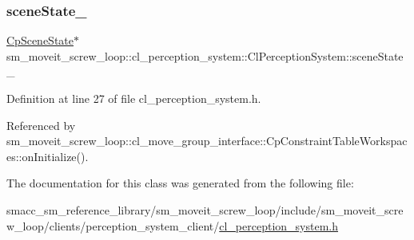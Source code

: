 \subsubsection{\texorpdfstring{scene\+State\+\_\+}{sceneState\_}}
{\footnotesize\ttfamily \hyperlink{classsm__moveit__screw__loop_1_1cl__perception__system_1_1CpSceneState}{Cp\+Scene\+State}$\ast$ sm\+\_\+moveit\+\_\+screw\+\_\+loop\+::cl\+\_\+perception\+\_\+system\+::\+Cl\+Perception\+System\+::scene\+State\+\_\+}



Definition at line 27 of file cl\+\_\+perception\+\_\+system.\+h.



Referenced by sm\+\_\+moveit\+\_\+screw\+\_\+loop\+::cl\+\_\+move\+\_\+group\+\_\+interface\+::\+Cp\+Constraint\+Table\+Workspaces\+::on\+Initialize().



The documentation for this class was generated from the following file\+:\begin{DoxyCompactItemize}
\item 
smacc\+\_\+sm\+\_\+reference\+\_\+library/sm\+\_\+moveit\+\_\+screw\+\_\+loop/include/sm\+\_\+moveit\+\_\+screw\+\_\+loop/clients/perception\+\_\+system\+\_\+client/\hyperlink{sm__moveit__screw__loop_2include_2sm__moveit__screw__loop_2clients_2perception__system__client_2cl__perception__system_8h}{cl\+\_\+perception\+\_\+system.\+h}\end{DoxyCompactItemize}
